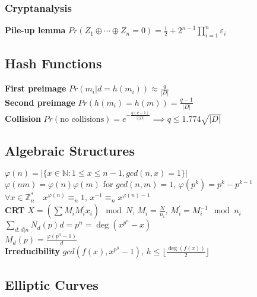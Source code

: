 \documentclass[twoside, 11pt]{article}
\begin{document}
            \subsubsection*{Cryptanalysis}
                \textbf{Pile-up lemma} $Pr(Z_{1} \oplus \cdots \oplus Z_{n} = 0) = \frac{1}{2} + 2^{n-1}\prod_{i=1}^{n}\varepsilon_{i}$ \\


        \subsection*{Hash Functions}
            \textbf{First preimage} $Pr(m_{i} | d=h(m_{i})) \approx \frac{q}{|D|}$ \\
            \textbf{Second preimage} $Pr(h(m_{i}) = h(m)) = \frac{q-1}{|D|}$ \\
            \textbf{Collision} $Pr(\text{no collisions}) = e^{-\frac{q(q-1)}{2|D|}} \implies q \leqslant 1.774\sqrt{|D|}$

        \subsection*{Algebraic Structures}
            $\varphi(n) = |\lbrace x \in \mathds{N} : 1 \leqslant x \leqslant n-1, gcd(n, x) = 1 \rbrace|$ \\
            $\varphi(nm) = \varphi(n)\varphi(m)$ for $gcd(n, m) =1$, $\varphi(p^{k}) = p^{k} - p^{k-1}$ \\
            $\forall x \in \mathds{Z}_{n}^{*} \quad x^{\varphi(n)} \equiv_{n} 1$, $x^{-1} \equiv_{n} x^{\varphi(n) -1}$ \\
            \textbf{CRT} $X = (\sum M_{i}M^{'}_{i}x_{i}) \mod{N}$, $M_{i} = \frac{N}{n_{i}}$, $M_{i}^{'} = M_{i}^{-1}\mod{n_{i}}$ \\ 
            $\sum_{d: d|n}N_{d}(p)d = p^{n} = \deg(x^{p^{n}}-x)$ \\
            $M_{d}(p) = \frac{\varphi(p^{n}-1)}{d}$ \\
            \textbf{Irreducibility} $gcd(f(x), x^{p^{h}}-1)$, $h \leqslant \lfloor \frac{\deg(f(x))}{2} \rfloor$ \\

        \subsection*{Elliptic Curves}
\end{document}
